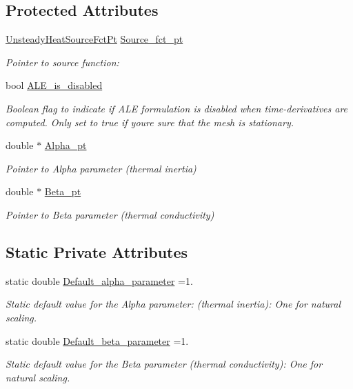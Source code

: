 \subsection*{Protected Attributes}
\begin{DoxyCompactItemize}
\item 
\hyperlink{classoomph_1_1UnsteadyHeatEquations_a967135cc2be2cb4b16fe0dc0b4d68a68}{Unsteady\+Heat\+Source\+Fct\+Pt} \hyperlink{classoomph_1_1UnsteadyHeatEquations_a775c7525ac08c848d6c980c1913f1e12}{Source\+\_\+fct\+\_\+pt}
\begin{DoxyCompactList}\small\item\em Pointer to source function\+: \end{DoxyCompactList}\item 
bool \hyperlink{classoomph_1_1UnsteadyHeatEquations_ad0573a152afa50ce714835b5551fc38c}{A\+L\+E\+\_\+is\+\_\+disabled}
\begin{DoxyCompactList}\small\item\em Boolean flag to indicate if A\+LE formulation is disabled when time-\/derivatives are computed. Only set to true if you\textquotesingle{}re sure that the mesh is stationary. \end{DoxyCompactList}\item 
double $\ast$ \hyperlink{classoomph_1_1UnsteadyHeatEquations_aeb5d0e576ea07b635fc0c6c74a3f3130}{Alpha\+\_\+pt}
\begin{DoxyCompactList}\small\item\em Pointer to Alpha parameter (thermal inertia) \end{DoxyCompactList}\item 
double $\ast$ \hyperlink{classoomph_1_1UnsteadyHeatEquations_ad1b36eb20c42a8ce7e3eba9d2b182bb8}{Beta\+\_\+pt}
\begin{DoxyCompactList}\small\item\em Pointer to Beta parameter (thermal conductivity) \end{DoxyCompactList}\end{DoxyCompactItemize}
\subsection*{Static Private Attributes}
\begin{DoxyCompactItemize}
\item 
static double \hyperlink{classoomph_1_1UnsteadyHeatEquations_ad2647a621a4cb3f4a8301a56badd1e4e}{Default\+\_\+alpha\+\_\+parameter} =1.
\begin{DoxyCompactList}\small\item\em Static default value for the Alpha parameter\+: (thermal inertia)\+: One for natural scaling. \end{DoxyCompactList}\item 
static double \hyperlink{classoomph_1_1UnsteadyHeatEquations_a85ec71a0ce9a5b85ce30b0aab0495ee4}{Default\+\_\+beta\+\_\+parameter} =1.
\begin{DoxyCompactList}\small\item\em Static default value for the Beta parameter (thermal conductivity)\+: One for natural scaling. \end{DoxyCompactList}\end{DoxyCompactItemize}
